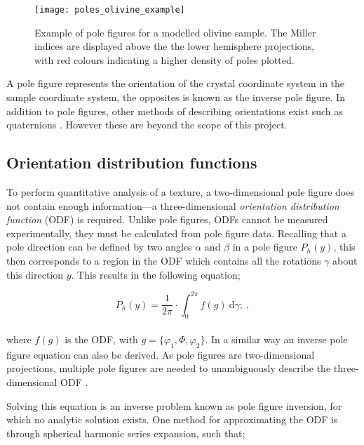 \documentclass[a4paper,12pt,twoside]{report}
\numberwithin{equation}{chapter}
\begin{document}
\begin{figure}[h]
  \centering
    \texttt{[image: poles\_olivine\_example]}
  \caption[Pole figure olivine example]{Example of pole figures for a modelled olivine sample. The Miller indices are displayed above the the lower hemisphere projections, with red colours indicating a higher density of poles plotted.}
  \label{fig:pole_olivine_example}
\end{figure}

A pole figure represents the orientation of the crystal coordinate system in the sample coordinate system, the opposites is known as the inverse pole figure. In addition to pole figures, other methods of describing orientations exist such as quaternions \citep{Quaternions}. However these are beyond the scope of this project. 

\subsection{Orientation distribution functions} \label{subsec:ODFs}
To perform quantitative analysis of a texture, a two-dimensional pole figure does not contain enough information---a three-dimensional \emph{orientation distribution function} (ODF) is required. Unlike pole figures, ODFs cannot be measured experimentally, they must be calculated from pole figure data. Recalling that a pole direction can be defined by two angles $\alpha$ and $\beta$ in a pole figure $P_h(y)$, this then corresponds to a region in the ODF which contains all the rotations $\gamma$ about this direction $y$. This results in the following equation;

\begin{equation} \label{eq:pole_figures}
P_h(y) = \frac{1}{2\pi} \cdot \int_{0}^{2\pi}f(g)\ \mathrm{d}\gamma;\ ,
\end{equation}
\\
where $f(g)$ is the ODF, with $g = \{\varphi_1,\Phi,\varphi_2\}$. In a similar way an inverse pole figure equation can also be derived. As pole figures are two-dimensional projections, multiple pole figures are needed to unambiguously describe the three-dimensional ODF \citep[and in fact it is only determined uniquely for an infinite number of pole figures,][]{Bunge1985}.

Solving this equation is an inverse problem known as pole figure inversion, for which no analytic solution exists. One method for approximating the ODF is through spherical harmonic series expansion, such that;
\end{document}
